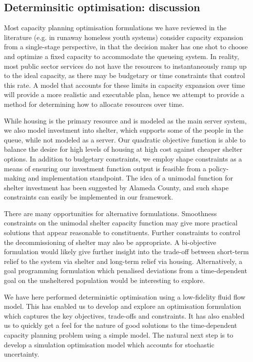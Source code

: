 \documentclass[12pt,a4paper]{article}
\begin{document}
\subsection{Determinsitic optimisation: discussion} \label{do-discuss}

Most capacity planning optimisation formulations we have reviewed in the literature (e.g. in runaway homeless youth systems) consider capacity expansion from a single-stage perspective, in that the decision maker has one shot to choose and optimize a fixed capacity to accommodate the queueing system.   In reality, most public sector services do not have the resources to instantaneously ramp up to the ideal capacity, as there may be budgetary or time constraints that control this rate.  A model that accounts for these limits in capacity expansion over time will provide a more realistic and executable plan, hence we attempt to provide a method for determining how to allocate resources over time.

While housing is the primary resource and is modeled as the main server system, we also model investment into shelter, which supports some of the people in the queue, while not modeled as a server. Our quadratic objective function is able to balance the desire for high levels of housing at high cost against cheaper shelter options. In addition to budgetary constraints, we employ shape constraints as a means of ensuring our investment function output is feasible from a policy-making and implementation standpoint.  The idea of a unimodal function for shelter investment has been suggested by Alameda County, and such shape constraints can easily be implemented in our framework.

There are many opportunities for alternative formulations.  Smoothness constraints on the unimodal shelter capacity function may give more practical solutions that appear reasonable to constituents. Further constraints to control the decommissioning of shelter may also be appropriate. A bi-objective formulation would likely give further insight into the trade-off between short-term relief to the system via shelter and long-term relief via housing. Alternatively, a goal programming formulation which penalised deviations from a time-dependent goal on the unsheltered population would be interesting to explore.

We have here performed deterministic optimisation using a low-fidelity fluid flow model. This has enabled us to develop and explore an optimisation formulation which captures the key objectives, trade-offs and constraints. It has also enabled us to quickly get a feel for the nature of good solutions to the time-dependent capacity planning problem using a simple model. The natural next step is to develop a simulation optimisation model which accounts for stochastic uncertainty.
\end{document}
